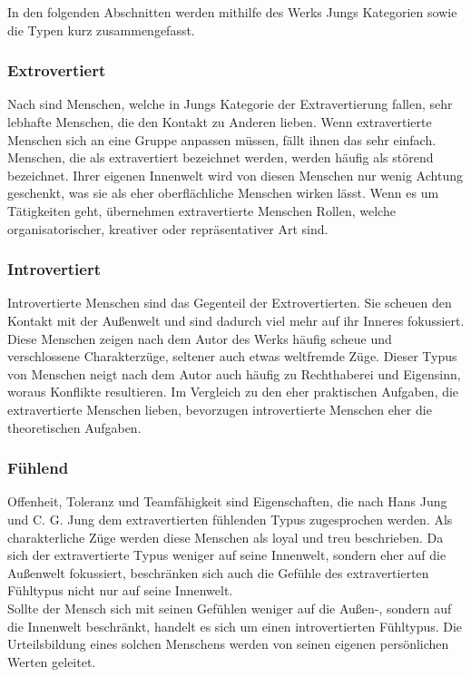 In den folgenden Abschnitten werden mithilfe des Werks  Jungs Kategorien sowie die Typen kurz zusammengefasst.
\subsubsection{Extrovertiert}
Nach \citeauthor{jung_2014} sind Menschen, welche in Jungs Kategorie der Extravertierung
fallen, sehr lebhafte Menschen, die den Kontakt zu Anderen lieben. Wenn extravertierte Menschen sich an eine Gruppe anpassen müssen, fällt ihnen das sehr einfach. Menschen, die als extravertiert bezeichnet werden, werden häufig als störend bezeichnet. Ihrer eigenen Innenwelt wird von diesen Menschen nur wenig Achtung geschenkt, was sie als eher oberflächliche Menschen wirken lässt. Wenn es um Tätigkeiten geht, übernehmen extravertierte Menschen Rollen, welche organisatorischer, kreativer oder repräsentativer Art sind. 

\noindent
\cite{jung_2014}

\subsubsection{Introvertiert}

Introvertierte Menschen sind das Gegenteil der Extrovertierten. Sie scheuen den Kontakt mit der Außenwelt und sind dadurch viel mehr auf ihr Inneres fokussiert. Diese Menschen zeigen nach dem Autor \citeauthor{jung_2014} des Werks  häufig scheue und verschlossene Charakterzüge, seltener auch etwas weltfremde Züge. Dieser Typus von Menschen neigt nach dem Autor auch häufig zu Rechthaberei und Eigensinn, woraus Konflikte resultieren. Im Vergleich zu den eher praktischen Aufgaben, die extravertierte Menschen lieben, bevorzugen introvertierte Menschen eher die theoretischen Aufgaben.

\noindent
\cite{jung_2014}

\subsubsection{Fühlend}
Offenheit, Toleranz und Teamfähigkeit sind Eigenschaften, die nach Hans Jung und C. G. Jung dem extravertierten fühlenden Typus zugesprochen werden. Als charakterliche Züge werden diese Menschen als loyal und treu beschrieben. Da sich der extravertierte Typus weniger auf seine Innenwelt, sondern eher auf die Außenwelt fokussiert, beschränken sich auch die Gefühle des extravertierten Fühltypus nicht nur auf seine Innenwelt.\\
Sollte der Mensch sich mit seinen Gefühlen weniger auf die Außen-, sondern auf die Innenwelt beschränkt, handelt es sich um einen introvertierten Fühltypus. Die Urteilsbildung eines solchen Menschens werden von seinen eigenen persönlichen Werten geleitet. 

